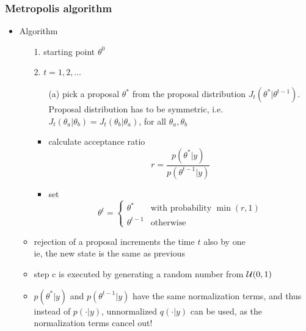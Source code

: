 \documentclass[10pt,handout]{beamer}
\begin{document}
\begin{frame}

\frametitle{ Metropolis algorithm}

  \begin{itemize}
  \item Algorithm
    \begin{itemize}
      \item[1.] starting point $\theta^0$
      \item[2.] $t=1,2,\ldots$
        \begin{itemize}
        \item[(a)] pick a proposal $\theta^{*}$ from the proposal distribution
          $J_t(\theta^{*}|\theta^{t-1})$. \\
          Proposal distribution has to be symmetric, i.e.\\
          $J_t(\theta_a|\theta_b)=J_t(\theta_b|\theta_a)$, for all
          $\theta_a,\theta_b$
        \item<2->[(b)] calculate acceptance ratio
          \begin{equation*}
            r=\frac{p(\theta^{*}|y)}{p(\theta^{t-1}|y)}
          \end{equation*}
          \vspace{-6mm}
        \item<3->[(c)] set
          \begin{equation*}
            \theta^t=
            \begin{cases}
              \theta^{*} & \text{with probability $\min(r,1)$}\\
              \theta^{t-1} & \text{otherwise}
            \end{cases}
          \end{equation*}
      \end{itemize}
      \vspace{-1.5\baselineskip}
    \item<5-> rejection of a proposal increments the time $t$ also by one\\
      ie, the new state is the same as previous
      \item<6-> step c is executed by generating a random number from
        $\mathcal{U}(0,1)$
      \item<7-> $p(\theta^*|y)$ and $p(\theta^{t-1}|y)$ have the same
        normalization terms, and thus instead of $p(\cdot|y)$,
        unnormalized $q(\cdot|y)$ can be used, as the normalization
        terms cancel out!
    \end{itemize}
  \end{itemize}

\end{frame}
\end{document}
